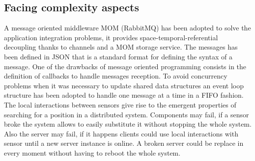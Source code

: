 \documentclass[11pt]{article}
\begin{document}
\subsection{Facing complexity aspects}
A message oriented middleware MOM (RabbitMQ) has been adopted to solve the application integration problems, it provides space-temporal-referential decoupling thanks to channels and a MOM storage service. The messages has been defined in JSON that is a standard format for defining the syntax of a message. One of the drawbacks of message oriented programming consists in the definition of callbacks to handle messages reception. To avoid concurrency problems when it was necessary to update shared data structures an event loop structure has been adopted to handle one message at a time in a FIFO fashion. The local interactions between sensors give rise to the emergent properties of searching for a position in a distributed system. Components may fail, if a sensor broke the system allows to easily substitute it without stopping the whole system. Also the server may fail, if it happens clients could use local interactions with sensor until a new server instance is online. A broken server could be replace in every moment without having to reboot the whole system.
\end{document}
